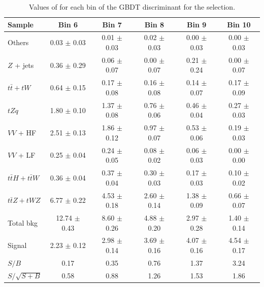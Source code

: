 \begin{table}[!h]
	\centering
	\small
	\begin{tabular}{|l|c|c|c|c|c|} 
		\hline 
		Sample 			       & Bin 6            & Bin 7           & Bin 8           & Bin 9           & Bin 10          \\ 
		\hline                 
		Others 			       & 0.03  $\pm$ 0.03 & 0.01 $\pm$ 0.03 & 0.02 $\pm$ 0.03 & 0.00 $\pm$ 0.03 & 0.00 $\pm$ 0.03 \\
		$Z$ + jets             & 0.36  $\pm$ 0.29 & 0.06 $\pm$ 0.07 & 0.00 $\pm$ 0.07 & 0.21 $\pm$ 0.24 & 0.00 $\pm$ 0.07 \\
		$t\bar{t}+tW$          & 0.64  $\pm$ 0.15 & 0.17 $\pm$ 0.08 & 0.16 $\pm$ 0.08 & 0.14 $\pm$ 0.07 & 0.17 $\pm$ 0.09 \\
		$tZq$ 			       & 1.80  $\pm$ 0.10 & 1.37 $\pm$ 0.08 & 0.76 $\pm$ 0.06 & 0.46 $\pm$ 0.04 & 0.27 $\pm$ 0.03 \\
		$VV$ + HF              & 2.51  $\pm$ 0.13 & 1.86 $\pm$ 0.12 & 0.97 $\pm$ 0.07 & 0.53 $\pm$ 0.06 & 0.19 $\pm$ 0.03 \\
		$VV$ + LF              & 0.25  $\pm$ 0.04 & 0.24 $\pm$ 0.05 & 0.08 $\pm$ 0.02 & 0.06 $\pm$ 0.03 & 0.00 $\pm$ 0.00 \\
		$t\bar{t}H+t\bar{t}W$  & 0.36  $\pm$ 0.04 & 0.37 $\pm$ 0.04 & 0.30 $\pm$ 0.03 & 0.17 $\pm$ 0.03 & 0.10 $\pm$ 0.02 \\
		$t\bar{t}Z+tWZ$        & 6.77  $\pm$ 0.22 & 4.53 $\pm$ 0.18 & 2.60 $\pm$ 0.14 & 1.38 $\pm$ 0.09 & 0.66 $\pm$ 0.07 \\
		\hline                                                                                                           
		Total bkg              & 12.74 $\pm$ 0.43 & 8.60 $\pm$ 0.26 & 4.88 $\pm$ 0.20 & 2.97 $\pm$ 0.28 & 1.40 $\pm$ 0.14 \\
		\hline                                                                                                           
		Signal                 & 2.23  $\pm$ 0.12 & 2.98 $\pm$ 0.14 & 3.69 $\pm$ 0.16 & 4.07 $\pm$ 0.16 & 4.54 $\pm$ 0.17 \\
		\hline                 
		$S/B$                  & 0.17             & 0.35            & 0.76            & 1.37            & 3.24            \\
		$S/\sqrt{S+B}$         & 0.58             & 0.88            & 1.26            & 1.53            & 1.86       \\
		\hline
	\end{tabular} 
	\caption{Values of \ssplusb for each bin of the GBDT discriminant for the \DLrc selection.}%
	\label{tab:yields:sr3_dl1rc_bdt}
\end{table}




